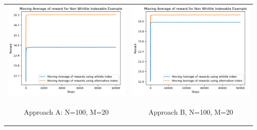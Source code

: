 \documentclass{slides}
\begin{document}
{\newpage
\begin{center}
\begin{tabular}{cc}
\includegraphics[scale=0.6]{non_whittle_comparison_A.png} &
\includegraphics[scale=0.6]{reward_non_whittle.png} \\
\begin{small}
 Approach A: N=100, M=20\end{small} & \begin{small}Approach B, N=100, M=20\end{small}\\

\end{tabular}
\end{center}}
\end{document}
